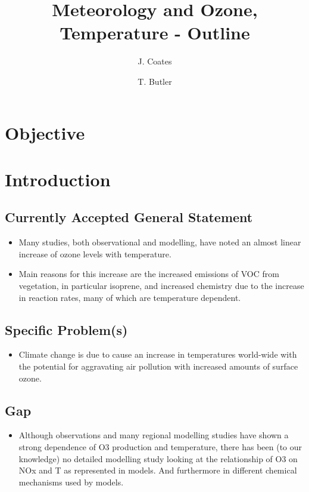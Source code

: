 \documentclass[11pt,a4paper]{article}
\title{Meteorology and Ozone, Temperature - Outline}
\author[1]{J. Coates}
\author[1]{T. Butler}
\affil[1]{Institute for Advanced Sustainability Studies, Potsdam, Germany}
\begin{document}
\maketitle

\section{Objective}


\section{Introduction} \label{s:introduction}
\subsection{Currently Accepted General Statement}
\begin{itemize}
    \item Many studies, both observational and modelling, have noted an almost linear increase of ozone levels with temperature.
    \item Main reasons for this increase are the increased emissions of VOC from vegetation, in particular isoprene, and increased chemistry due to the increase in reaction rates, many of which are temperature dependent.
\end{itemize}

\subsection{Specific Problem(s)}
\begin{itemize}
    \item Climate change is due to cause an increase in temperatures world-wide with the potential for aggravating air pollution with increased amounts of surface ozone.
\end{itemize}

\subsection{Gap}
\begin{itemize}
    \item Although observations and many regional modelling studies have shown a strong dependence of O3 production and temperature, there has been (to our knowledge) no detailed modelling study looking at the relationship of O3 on NOx and T as represented in models. And furthermore in different chemical mechanisms used by models.
\end{itemize}
\end{document}
